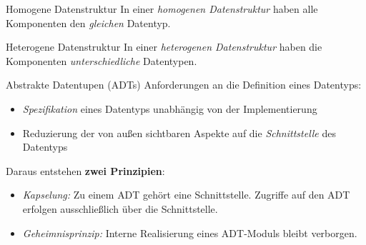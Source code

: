 \documentclass[german]{../spicker}
\begin{document}
\begin{defi}{Homogene Datenstruktur}
    In einer \emph{homogenen Datenstruktur} haben alle Komponenten den \emph{gleichen} Datentyp.
\end{defi}

\begin{defi}{Heterogene Datenstruktur}
    In einer \emph{heterogenen Datenstruktur} haben die Komponenten \emph{unterschiedliche} Datentypen.
\end{defi}

\begin{defi}{Abstrakte Datentupen (ADTs)}
    Anforderungen an die Definition eines Datentyps:
    \begin{itemize}
        \item \emph{Spezifikation} eines Datentyps unabhängig von der Implementierung
        \item Reduzierung der von außen sichtbaren Aspekte auf die \emph{Schnittstelle} des Datentyps
    \end{itemize}

    Daraus entstehen \textbf{zwei Prinzipien}:
    \begin{itemize}
        \item \emph{Kapselung:}
              \subitem Zu einem ADT gehört eine Schnittstelle.
              \subitem Zugriffe auf den ADT erfolgen ausschließlich über die Schnittstelle.
        \item \emph{Geheimnisprinzip:}
              \subitem Interne Realisierung eines ADT-Moduls bleibt verborgen.
    \end{itemize}
\end{defi}
\end{document}
